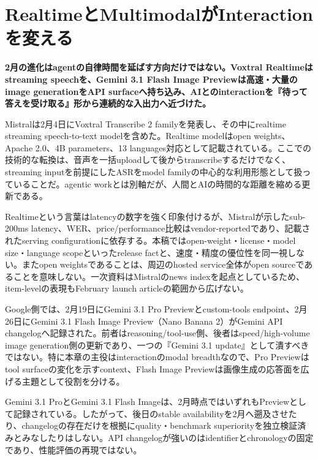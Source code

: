 \section{RealtimeとMultimodalがInteractionを変える}
\label{pkg:realtime-multimodal-interaction}
\noindent\textbf{2月の進化はagentの自律時間を延ばす方向だけではない。Voxtral Realtimeはstreaming speechを、Gemini 3.1 Flash Image Previewは高速・大量のimage generationをAPI surfaceへ持ち込み、AIとのinteractionを『待って答えを受け取る』形から連続的な入出力へ近づけた。}\autocite{src-a24fd97eb3d0,src-d8b7c1c36830}

Mistralは2月4日にVoxtral Transcribe 2 familyを発表し、その中にrealtime streaming speech-to-text modelを含めた。Realtime modelはopen weights、Apache 2.0、4B parameters、13 languages対応として記載されている。ここでの技術的な転換は、音声を一括uploadして後からtranscribeするだけでなく、streaming inputを前提にしたASRをmodel familyの中心的な利用形態として扱っていることだ。agentic workとは別軸だが、人間とAIの時間的な距離を縮める更新である。\autocite{src-d8b7c1c36830}


\begin{claimboundary}
Realtimeという言葉はlatencyの数字を強く印象付けるが、Mistralが示したsub-200ms latency、WER、price/performance比較はvendor-reportedであり、記載されたserving configurationに依存する。本稿ではopen-weight・license・model size・language scopeといったrelease factと、速度・精度の優位性を同一視しない。またopen weightsであることは、周辺のhosted service全体がopen sourceであることを意味しない。一次資料はMistralのnews indexを起点としているため、item-levelの表現もFebruary launch articleの範囲から広げない。\autocite{src-d8b7c1c36830}
\end{claimboundary}

Google側では、2月19日にGemini 3.1 Pro Previewとcustom-tools endpoint、2月26日にGemini 3.1 Flash Image Preview（Nano Banana 2）がGemini API changelogへ記録された。前者はreasoning/tool-use側、後者はspeed/high-volume image generation側の更新であり、一つの『Gemini 3.1 update』として潰すべきではない。特に本章の主役はinteractionのmodal breadthなので、Pro Previewはtool surfaceの変化を示すcontext、Flash Image Previewは画像生成の応答面を広げる主題として役割を分ける。\autocite{src-a24fd97eb3d0}


\begin{claimboundary}
Gemini 3.1 ProとGemini 3.1 Flash Imageは、2月時点ではいずれもPreviewとして記録されている。したがって、後日のstable availabilityを2月へ遡及させたり、changelogの存在だけを根拠にquality・benchmark superiorityを独立検証済みとみなしたりはしない。API changelogが強いのはidentifierとchronologyの固定であり、性能評価の再現ではない。\autocite{src-a24fd97eb3d0}
\end{claimboundary}

